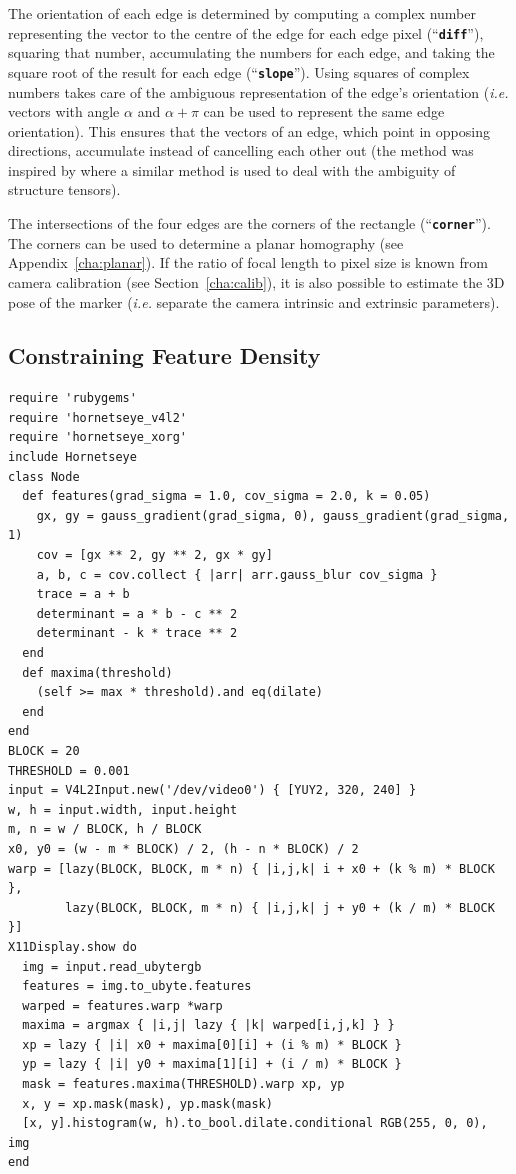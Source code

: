 \documentclass[12pt,a4paper,oneside,openright]{book}
\newcommand{\ie}{\emph{i.e.} }
\newcommand{\sct}[1]{Section~\ref{cha:#1}}
\newcommand{\anx}[1]{Appendix~\ref{cha:#1}}
\newcommand{\code}[1]{``\texttt{\textbf{\textcolor{codegray}{\small{#1}}}}''}
\begin{document}
\begin{CJK}{UTF8}{}
The orientation of each edge is determined by computing a complex number representing the vector to the centre of the edge for each edge pixel (\code{diff}), squaring that number, accumulating the numbers for each edge, and taking the square root of the result for each edge (\code{slope}). Using squares of complex numbers takes care of the ambiguous representation of the edge's orientation (\ie vectors with angle $\alpha$ and $\alpha+\pi$ can be used to represent the same edge orientation). This ensures that the vectors of an edge, which point in opposing directions, accumulate instead of cancelling each other out (the method was inspired by \citet{RefWorks:270} where a similar method is used to deal with the ambiguity of structure tensors).

The intersections of the four edges are the corners of the rectangle (\code{corner}). The corners can be used to determine a planar homography (see \anx{planar}). If the ratio of focal length to pixel size is known from camera calibration (see \sct{calib}), it is also possible to estimate the \ac{3D} pose of the marker (\ie separate the camera intrinsic and extrinsic parameters).

\subsection{Constraining Feature Density}\label{cha:featuredens}
\begin{lstlisting}
require 'rubygems'
require 'hornetseye_v4l2'
require 'hornetseye_xorg'
include Hornetseye
class Node
  def features(grad_sigma = 1.0, cov_sigma = 2.0, k = 0.05)
    gx, gy = gauss_gradient(grad_sigma, 0), gauss_gradient(grad_sigma, 1)
    cov = [gx ** 2, gy ** 2, gx * gy]
    a, b, c = cov.collect { |arr| arr.gauss_blur cov_sigma }
    trace = a + b
    determinant = a * b - c ** 2
    determinant - k * trace ** 2
  end
  def maxima(threshold)
    (self >= max * threshold).and eq(dilate)
  end
end
BLOCK = 20
THRESHOLD = 0.001
input = V4L2Input.new('/dev/video0') { [YUY2, 320, 240] }
w, h = input.width, input.height
m, n = w / BLOCK, h / BLOCK
x0, y0 = (w - m * BLOCK) / 2, (h - n * BLOCK) / 2
warp = [lazy(BLOCK, BLOCK, m * n) { |i,j,k| i + x0 + (k % m) * BLOCK },
        lazy(BLOCK, BLOCK, m * n) { |i,j,k| j + y0 + (k / m) * BLOCK }]
X11Display.show do
  img = input.read_ubytergb
  features = img.to_ubyte.features
  warped = features.warp *warp
  maxima = argmax { |i,j| lazy { |k| warped[i,j,k] } }
  xp = lazy { |i| x0 + maxima[0][i] + (i % m) * BLOCK }
  yp = lazy { |i| y0 + maxima[1][i] + (i / m) * BLOCK }
  mask = features.maxima(THRESHOLD).warp xp, yp
  x, y = xp.mask(mask), yp.mask(mask)
  [x, y].histogram(w, h).to_bool.dilate.conditional RGB(255, 0, 0), img
end
\end{lstlisting}


\end{CJK}
\end{document}
